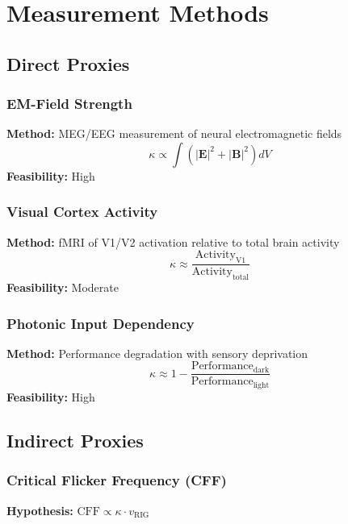\documentclass[11pt,a4paper]{article}
\begin{document}
\section{Measurement Methods}

\subsection{Direct Proxies}

\subsubsection{EM-Field Strength}
\textbf{Method:} MEG/EEG measurement of neural electromagnetic fields
\begin{equation}
\kappa \propto \int \left(|\mathbf{E}|^2 + |\mathbf{B}|^2\right) dV
\end{equation}
\textbf{Feasibility:} High

\subsubsection{Visual Cortex Activity}
\textbf{Method:} fMRI of V1/V2 activation relative to total brain activity
\begin{equation}
\kappa \approx \frac{\text{Activity}_{\text{V1}}}{\text{Activity}_{\text{total}}}
\end{equation}
\textbf{Feasibility:} Moderate

\subsubsection{Photonic Input Dependency}
\textbf{Method:} Performance degradation with sensory deprivation
\begin{equation}
\kappa \approx 1 - \frac{\text{Performance}_{\text{dark}}}{\text{Performance}_{\text{light}}}
\end{equation}
\textbf{Feasibility:} High

\subsection{Indirect Proxies}

\subsubsection{Critical Flicker Frequency (CFF)}
\textbf{Hypothesis:} $\text{CFF} \propto \kappa \cdot v_{\text{RIG}}$
\end{document}
